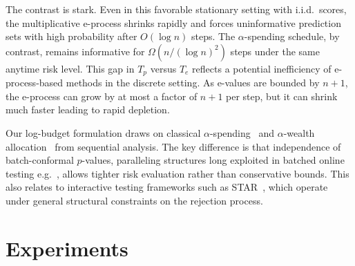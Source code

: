 \documentclass{uai2026} %
\newcommand{\1}{\mathbf{1}}
\begin{document}
The contrast is stark.
Even in this favorable stationary setting with i.i.d.\ scores, the multiplicative e-process shrinks rapidly and forces uninformative prediction sets with high probability after $O(\log n)$ steps.
The $\alpha$-spending schedule, by contrast, remains informative for $\Omega(n / (\log n)^2)$ steps under the same anytime risk level.
This gap in $T_p$ versus $T_e$ reflects a potential inefficiency of e-process-based methods in the discrete setting. As e-values are bounded by $n{+}1$, the e-process can grow by at most a factor of $n{+}1$ per step, but it can shrink much faster leading to rapid depletion.

Our log-budget formulation draws on classical $\alpha$-spending~\citep{lan1983discrete} and $\alpha$-wealth allocation~\citep{foster2008alpha} from sequential analysis.
The key difference is that independence of batch-conformal $p$-values, paralleling structures long exploited in batched online testing e.g.~\citep{zrnic2020power}, allows tighter risk evaluation rather than conservative bounds. This also relates to interactive testing frameworks such as STAR~\citep{lei2017star}, which operate under general structural constraints on the rejection process.

\section{Experiments}
\label{sec:experiments}
\end{document}
